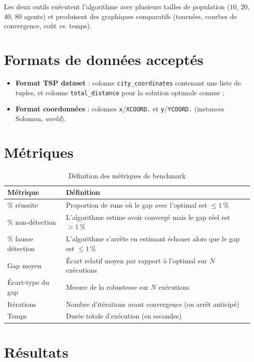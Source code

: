 \documentclass[12pt,a4paper]{report}
\begin{document}
Les deux outils exécutent l'algorithme avec plusieurs tailles de population
($10$, $20$, $40$, $80$ agents) et produisent des graphiques comparatifs
(tournées, courbes de convergence, coût \textit{vs.} temps).

\section{Formats de données acceptés}
\begin{itemize}
	\item \textbf{Format TSP dataset} : colonne \texttt{city\_coordinates}
	      contenant une liste de tuples, et colonne \texttt{total\_distance}
	      pour la solution optimale connue ;
	\item \textbf{Format coordonnées} : colonnes \texttt{x}/\texttt{XCOORD.}
	      et \texttt{y}/\texttt{YCOORD.} (instances Solomon, \textit{world}).
\end{itemize}

\section{Métriques}

\begin{table}[h]
	\centering
	\begin{tabular}{@{}ll@{}}
		\toprule
		\textbf{Métrique} & \textbf{Définition} \\
		\midrule
		\% réussite        & Proportion de runs où le gap avec l'optimal est $\leq 1\,\%$ \\
		\% non-détection   & L'algorithme estime avoir convergé mais le gap réel est $> 1\,\%$ \\
		\% fausse détection & L'algorithme s'arrête en estimant échouer alors que le gap est $\leq 1\,\%$ \\
		Gap moyen          & Écart relatif moyen par rapport à l'optimal sur $N$ exécutions \\
		Écart-type du gap  & Mesure de la robustesse sur $N$ exécutions \\
		Itérations         & Nombre d'itérations avant convergence (ou arrêt anticipé) \\
		Temps              & Durée totale d'exécution (en secondes) \\
		\bottomrule
	\end{tabular}
	\caption{Définition des métriques de benchmark}
\end{table}

\section{Résultats}
\end{document}

